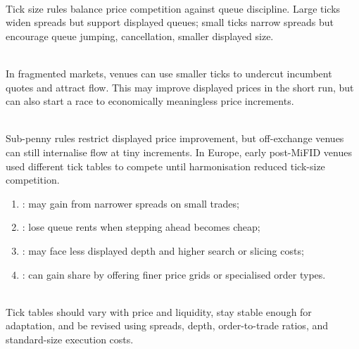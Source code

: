 \documentclass[a4paper,oneside,openany]{book}
\begin{document}
\begin{marketrule} \\
Tick size rules balance price competition against queue discipline. Large ticks widen spreads but support displayed queues; small ticks narrow spreads but encourage queue jumping, cancellation, smaller displayed size.
\end{marketrule}

\begin{caveat} \\
In fragmented markets, venues can use smaller ticks to undercut incumbent quotes and attract flow. This may improve displayed prices in the short run, but can also start a race to economically meaningless price increments.
\end{caveat}

\begin{marketrule} \\
Sub-penny rules restrict displayed price improvement, but off-exchange venues can still internalise flow at tiny increments. In Europe, early post-MiFID venues used different tick tables to compete until harmonisation reduced tick-size competition.
\end{marketrule}

\begin{taxonomy} 
\begin{enumerate}[label=\roman*.]
\setlength{\itemsep}{0pt}
\item {}: may gain from narrower spreads on small trades;
\item {}: lose queue rents when stepping ahead becomes cheap;
\item {}: may face less displayed depth and higher search or slicing costs;
\item {}: can gain share by offering finer price grids or specialised order types.
\end{enumerate}
\end{taxonomy}

\begin{principle} \\
Tick tables should vary with price and liquidity, stay stable enough for adaptation, and be revised using spreads, depth, order-to-trade ratios, and standard-size execution costs.
\end{principle}
\end{document}

